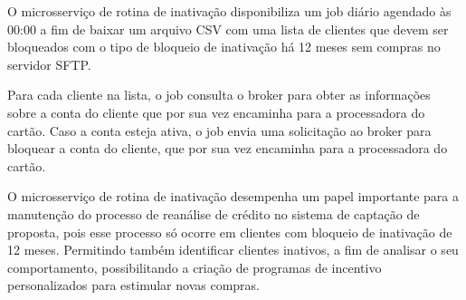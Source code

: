 O microsserviço de rotina de inativação disponibiliza um job diário agendado às 
00:00 a fim de baixar um arquivo CSV com uma lista de clientes que devem ser 
bloqueados com o tipo de bloqueio de inativação há 12 meses sem compras no 
servidor SFTP. 

Para cada cliente na lista, o job consulta o broker para obter as informações sobre 
a conta do cliente que por sua vez encaminha para a processadora do cartão. Caso a 
conta esteja ativa, o job envia uma solicitação ao broker para bloquear a conta do cliente, 
que por sua vez encaminha para a processadora do cartão.

O microsserviço de rotina de inativação desempenha um papel importante para a 
manutenção do processo de reanálise de crédito no sistema de captação de proposta, 
pois esse processo só ocorre em clientes com bloqueio de inativação de 12 meses. 
Permitindo também identificar clientes inativos, a fim de analisar o seu comportamento,
possibilitando a criação de programas de incentivo personalizados para estimular 
novas compras.
